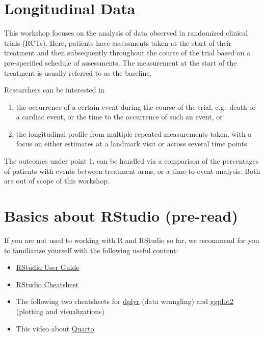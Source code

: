 \documentclass[
  letterpaper,
  DIV=11,
  numbers=noendperiod]{scrreprt}
\begin{document}
\hypertarget{longitudinal-data}{%
\section{Longitudinal Data}\label{longitudinal-data}}

This workshop focuses on the analysis of data observed in randomized
clinical trials (RCTs). Here, patients have assessments taken at the
start of their treatment and then subsequently throughout the course of
the trial based on a pre-specified schedule of assessments. The
measurement at the start of the treatment is usually referred to as the
baseline.

Researchers can be interested in

\begin{enumerate}
\def\labelenumi{\arabic{enumi}.}
\item
  the occurrence of a certain event during the course of the trial,
  e.g.~death or a cardiac event, or the time to the occurrence of such
  an event, or
\item
  the longitudinal profile from multiple repeated measurements taken,
  with a focus on either estimates at a landmark visit or across several
  time points.
\end{enumerate}

The outcomes under point 1. can be handled via a comparison of the
percentages of patients with events between treatment arms, or a
time-to-event analysis. Both are out of scope of this workshop.

\hypertarget{basics-about-rstudio-pre-read}{%
\section{Basics about RStudio
(pre-read)}\label{basics-about-rstudio-pre-read}}

If you are not used to working with R and RStudio so far, we recommend
for you to familiarize yourself with the following useful content:

\begin{itemize}
\item
  \href{https://docs.posit.co/ide/user/}{RStudio User Guide}
\item
  \href{https://rstudio.github.io/cheatsheets/html/rstudio-ide.html}{RStudio
  Cheatsheet}
\item
  The following two cheatsheets for
  \href{https://rstudio.github.io/cheatsheets/html/data-transformation.html}{dplyr}
  (data wrangling) and
  \href{https://rstudio.github.io/cheatsheets/html/data-visualization.html}{ggplot2}
  (plotting and visualizations)
\item
  This video about
  \href{https://www.youtube.com/watch?v=_f3latmOhew}{Quarto}
\end{itemize}
\end{document}
